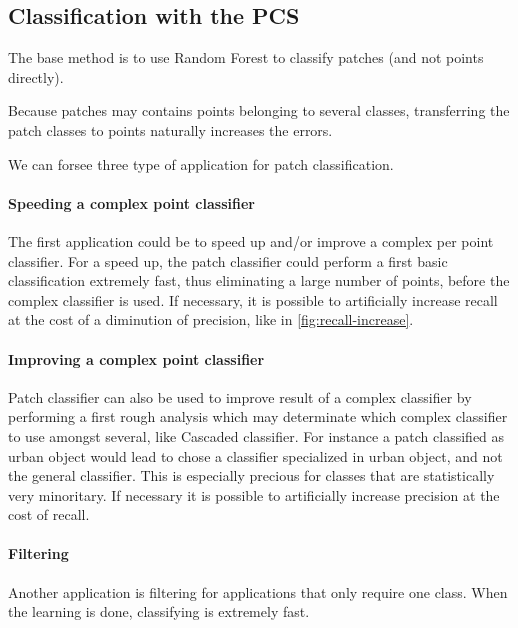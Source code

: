 		
		
	\subsection{Classification with the PCS}
		\label{method.classif}
			
		The base method is to use Random Forest to classify patches (and not points directly).
		
		Because patches may contains points belonging to several classes, transferring the patch classes to points naturally increases the errors.
		
		We can forsee three type of application for patch classification.
		
		\paragraph{Speeding a complex point classifier}
		The first application could be to speed up and/or improve a complex per point classifier.
		For a speed up, the patch classifier could perform a first basic classification extremely fast, thus eliminating a large number of points, before the complex classifier is used. 
		If necessary, it is possible to artificially increase recall at the cost of a diminution of precision, like in \ref{fig:recall-increase}.
		
		
		\paragraph{Improving a complex point classifier}
		Patch classifier can also be used to improve result of a complex classifier by performing a first rough analysis which may determinate which complex classifier to use amongst several, like Cascaded classifier.
		For instance a patch classified as urban object would lead to chose a classifier specialized in urban object, and not the general classifier. This is especially precious for classes that are statistically very minoritary.
		If necessary it is possible to artificially increase precision at the cost of recall.
		
		
		
		\paragraph{Filtering}
		Another application is filtering for applications that only require one class. When the learning is done, classifying is extremely fast.
		

